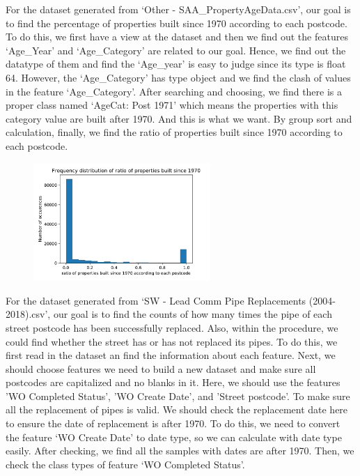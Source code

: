 \documentclass[11pt,twoside]{article}
\numberwithin{Theorem}{section}
\numberwithin{Definition}{section}
\numberwithin{Lemma}{section}
\numberwithin{Algorithm}{section}
\numberwithin{equation}{section}
\begin{document}
For the dataset generated from ‘Other - SAA\_PropertyAgeData.csv’, our goal is to find the percentage of properties built since 1970 according to each postcode. To do this, we first have a view at the dataset and then we find out the features ‘Age\_Year’ and ‘Age\_Category’ are related to our goal. Hence, we find out the datatype of them and find the ‘Age\_year’ is easy to judge since its type is float 64. However, the ‘Age\_Category’ has type object and we find the clash of values in the feature ‘Age\_Category’. After searching and choosing, we find there is a proper class named ‘AgeCat: Post 1971’ which means the properties with this category value are built after 1970. And this is what we want. By group sort and calculation, finally, we find the ratio of properties built since 1970 according to each postcode.

\begin{figure}[!ht]
    \centering
    \includegraphics[width=0.6\textwidth]{p9.pdf}
    \end{figure}

For the dataset generated from ‘SW - Lead Comm Pipe Replacements (2004-2018).csv’, our goal is to find the counts of how many times the pipe of each street postcode has been successfully replaced. Also, within the procedure, we could find whether the street has or has not replaced its pipes. To do this, we first read in the dataset an find the information about each feature. Next, we should choose features we need to build a new dataset and make sure all postcodes are capitalized and no blanks in it. Here, we should use the features 'WO Completed Status', 'WO Create Date', and 'Street postcode'. To make sure all the replacement of pipes is valid. We should check the replacement date here to ensure the date of replacement is after 1970. To do this, we need to convert the feature ‘WO Create Date’ to date type, so we can calculate with date type easily. After checking, we find all the samples with dates are after 1970. Then, we check the class types of feature ‘WO Completed Status’.
\end{document}
